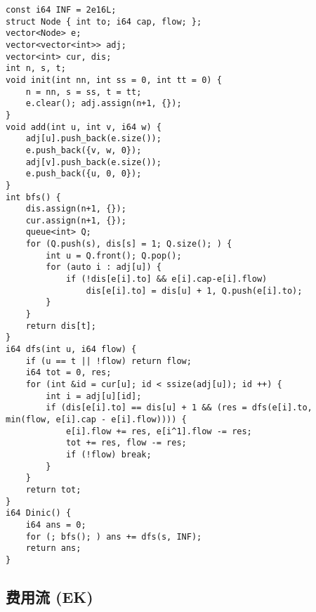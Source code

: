 \documentclass[a4paper,landscape,twocolumn]{ctexart}
\begin{document}
\begin{lstlisting}
const i64 INF = 2e16L;
struct Node { int to; i64 cap, flow; };
vector<Node> e;
vector<vector<int>> adj;
vector<int> cur, dis;
int n, s, t;
void init(int nn, int ss = 0, int tt = 0) {
	n = nn, s = ss, t = tt;
	e.clear(); adj.assign(n+1, {});
}
void add(int u, int v, i64 w) {
	adj[u].push_back(e.size());
	e.push_back({v, w, 0});
	adj[v].push_back(e.size());
	e.push_back({u, 0, 0});
}
int bfs() {
	dis.assign(n+1, {});
	cur.assign(n+1, {});
	queue<int> Q;
	for (Q.push(s), dis[s] = 1; Q.size(); ) {
		int u = Q.front(); Q.pop();
		for (auto i : adj[u]) {
			if (!dis[e[i].to] && e[i].cap-e[i].flow)
				dis[e[i].to] = dis[u] + 1, Q.push(e[i].to);
		}
	}
	return dis[t];
}
i64 dfs(int u, i64 flow) {
	if (u == t || !flow) return flow;
	i64 tot = 0, res;
	for (int &id = cur[u]; id < ssize(adj[u]); id ++) {
		int i = adj[u][id];
		if (dis[e[i].to] == dis[u] + 1 && (res = dfs(e[i].to, min(flow, e[i].cap - e[i].flow)))) {
			e[i].flow += res, e[i^1].flow -= res;
			tot += res, flow -= res;
			if (!flow) break;
		}
	}
	return tot;
}
i64 Dinic() {
	i64 ans = 0;
	for (; bfs(); ) ans += dfs(s, INF);
	return ans;
}
\end{lstlisting}

\subsection{费用流 (EK)}
\end{document}
